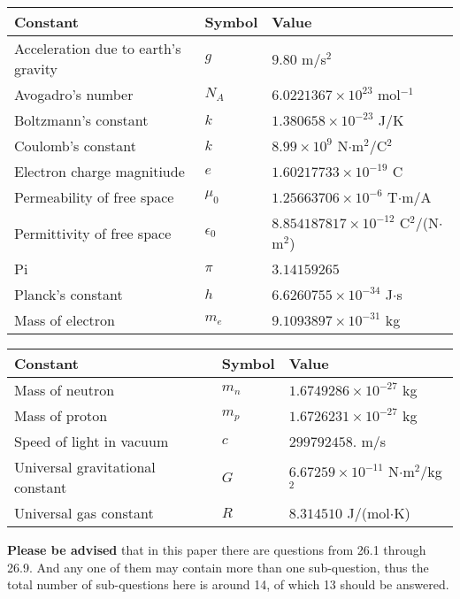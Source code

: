 \documentclass[12pt]{article}
\begin{document}
\noindent\begin{tabular}{|l|l|l|}
\hline
Constant & Symbol & Value \\
\hline
Acceleration due to earth's gravity &
$g$ &
 $ 9.80 $
m/s$^2$ \\
\hline
Avogadro's number &
$N_A$ &
 $ 6.0221367 \times 10^{23} $
mol$^{-1}$ \\
\hline
Boltzmann's constant &
$k$ &
 $ 1.380658 \times 10^{-23} $
J/K \\
\hline
Coulomb's constant &
$k$ &
 $ 8.99 \times 10^{9} $
N$\cdot $m$^2$/C$^2$ \\
\hline
Electron charge magnitiude &
$e$ &
 $ 1.60217733 \times 10^{-19} $
C \\
\hline
Permeability of free space &
$\mu _0$ &
 $ 1.25663706 \times 10^{-6} $
T$\cdot $m/A \\
\hline
Permittivity of free space &
$\epsilon _0$ &
 $ 8.854187817 \times 10^{-12} $
C$^2$/(N$\cdot $m$^2$) \\
\hline
Pi &
$\pi$ &
 $ 3.14159265 $
$ $ \\
\hline
Planck's constant &
$h$ &
 $ 6.6260755 \times 10^{-34} $
J$\cdot $s \\
\hline
Mass of electron &
$m_e$ &
 $ 9.1093897 \times 10^{-31} $
kg \\
\hline
\end{tabular}
 
 
\noindent\begin{tabular}{|l|l|l|}
\hline
Constant & Symbol & Value \\
\hline
Mass of neutron &
$m_n$ &
 $ 1.6749286 \times 10^{-27} $
kg \\
\hline
Mass of proton &
$m_p$ &
 $ 1.6726231 \times 10^{-27} $
kg \\
\hline
Speed of light in vacuum &
$c$ &
 $ 299792458. $
m/s \\
\hline
Universal gravitational constant &
$G$ &
 $ 6.67259 \times 10^{-11} $
N$\cdot $m$^2$/kg$^2$ \\
\hline
Universal gas constant &
$R$ &
 $ 8.314510 $
J/(mol$\cdot $K) \\
\hline
\end{tabular}
 
 
{\textbf{\large{Please be advised}}} that in this paper there are questions from
26.1 through
26.9.
And any one of them may contain more than one sub-question, thus the total number
of sub-questions here is around 14, of which
13 should be answered.
 
\vspace{0.3in}
 
\end{document}
